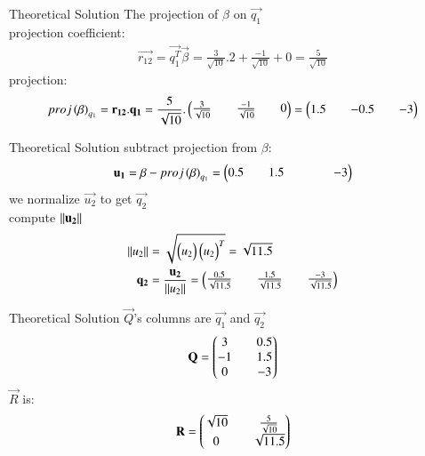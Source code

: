 \documentclass{beamer}
\begin{document}
\begin{frame}{Theoretical Solution}
The projection of $\beta$ on $\vec{q_1}$\\
projection coefficient:
\begin{align}
    \vec{r_{12}}=\vec{q_1^T}\vec{\beta}=\frac{3}{\sqrt{10}}.2+\frac{-1}{\sqrt{10}}+0=\frac{5}{\sqrt{10}}
\end{align}
projection:
\begin{align}
    proj\left(\mathbf{\beta}\right)_{q_1}=\mathbf{r_{12}}.\mathbf{q_1}=\frac{5}{\sqrt{10}}.\begin{pmatrix}\frac{3}{\sqrt{10}}&&\frac{-1}{\sqrt{10}}&&0\end{pmatrix}=\begin{pmatrix}1.5 && -0.5 &&-3\end{pmatrix}
\end{align}
\end{frame}
\begin{frame}{Theoretical Solution}
subtract projection from $\beta$:
\begin{align}
    \mathbf{u_1}=\beta-proj\left(\mathbf{\beta}\right)_{q_1}=\begin{pmatrix}0.5&&1.5&&&&-3\end{pmatrix}
\end{align}
we normalize $\vec{u_2}$ to get $\vec{q_2}$\\
compute $\left\lVert\mathbf{u_2}\right\rVert$
\begin{align}
    \left\lVert u_2\right\rVert&=\sqrt{\begin{pmatrix}u_2\end{pmatrix}\begin{pmatrix}u_2\end{pmatrix}^T}=\sqrt{11.5}\\
    \mathbf{q_2}&=\frac{\mathbf{u_2}}{\left\lVert u_2\right\rVert}=\begin{pmatrix}\frac{0.5}{\sqrt{11.5}}&& \frac{1.5}{\sqrt{11.5}}&&\frac{-3}{\sqrt{11.5}}\end{pmatrix}
\end{align}
\end{frame}
\begin{frame}{Theoretical Solution}
$\vec{Q}$'s columns are $\vec{q_1}$ and $\vec{q_2}$
\begin{align}
    \mathbf{Q}=\begin{pmatrix}3 && 0.5 \\ -1 && 1.5 \\ 0 && -3\end{pmatrix}
\end{align}
$\vec{R}$ is:
\begin{align}
    \mathbf{R}=\begin{pmatrix}\sqrt{10} && \frac{5}{\sqrt{10}}\\0 &&\sqrt{11.5}\end{pmatrix}
\end{align}
\end{frame}
\end{document}
